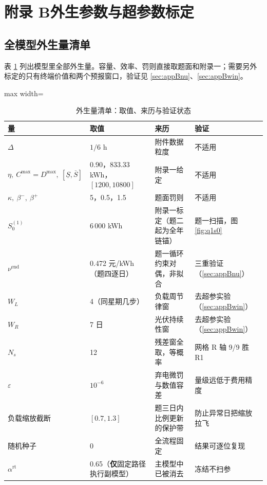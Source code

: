 \documentclass[12pt,a4paper]{ctexart}
\renewcommand{\thesubsection}{\arabic{section}.\arabic{subsection}}
\newcommand{\nuend}{\nu^{\mathrm{end}}}
\begin{document}
\section*{附录 B\quad 外生参数与超参数标定}
\setcounter{section}{2}
\setcounter{subsection}{0}
\renewcommand{\thesubsection}{B.\arabic{subsection}}

\subsection{全模型外生量清单}

表 \ref{tab:hyper} 列出模型里全部外生量。容量、效率、罚则直接取题面和附录一；需要另外标定的只有终端价值和两个预报窗口，验证见 \ref{sec:appBnu}、\ref{sec:appBwin}。

\begin{table}[H]
\centering\footnotesize
\caption{外生量清单：取值、来历与验证状态}
\begin{adjustbox}{max width=\textwidth}
\begin{tabular}{llll}
\toprule
量 & 取值 & 来历 & 验证 \\
\midrule
$\Delta$ & $1/6$ h & 附件数据粒度 & 不适用 \\
$\eta,\ C^{\max}{=}D^{\max},\ [\underline S,\overline S]$ & 0.90，833.33 kWh，$[1200,10800]$ & 附录一给定 & 不适用 \\
$\kappa,\ \beta^-,\ \beta^+$ & 5，0.5，1.5 & 题面罚则 & 不适用 \\
$S_0^{(1)}$ & 6\,000 kWh & 附录一标定（题二起为全年链锚） & 题一扫描，图 \ref{fig:q1s0} \\
\midrule
$\nuend$ & 0.472 元/kWh（题四逐日） & 题一循环约束对偶，非拟合 & 三重验证（\ref{sec:appBnu}） \\
$W_L$ & 4（同星期几步） & 负载周节律窗 & 去超参实验（\ref{sec:appBwin}） \\
$W_R$ & 7 日 & 光伏持续性窗 & 去超参实验（\ref{sec:appBwin}） \\
$N_s$ & 12 & 残差窗全取，等概率 & 网格 R 轴 9/9 胜 R1 \\
\midrule
$\varepsilon$ & $10^{-6}$ & 弃电微罚与数值容差 & 量级远低于费用精度 \\
负载缩放截断 & $[0.7,1.3]$ & 题三日内比例更新的保护带 & 防止异常日把缩放拉飞 \\
随机种子 & 0 & 全流程固定 & 结果可逐位复现 \\
$\alpha^{\mathrm{rt}}$ & 0.65（\textbf{仅}固定路径执行副模型） & 主模型中已被消去 & 冻结不扫参 \\
\bottomrule
\end{tabular}
\end{adjustbox}
\label{tab:hyper}
\end{table}
\end{document}
